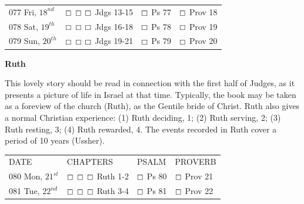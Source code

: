 \documentclass[11pt,landscape,twocolumn,letterpaper]{article}
\begin{document}
\begin{tabular}{p{0.85in}p{1.25in}p{1.2in}p{1.2in}}
\tiny 077 \normalsize Fri, $18^{nd}$ & $\boxempty$ $\boxempty$ $\boxempty$ \hspace{.05in} \textcolor[rgb]{1.00,0.00,0.00}{Jdgs 13-15} & $\boxempty$ \hspace{.05in} \textcolor[rgb]{0.00,1.00,0.00}{Ps 77} & $\boxempty$ \hspace{.05in} \textcolor[rgb]{0.00,0.00,1.00}{Prov 18}  \\

\tiny 078 \normalsize Sat, $19^{th}$ & $\boxempty$ $\boxempty$ $\boxempty$ \hspace{.05in} \textcolor[rgb]{1.00,0.00,0.00}{Jdgs 16-18} & $\boxempty$ \hspace{.05in} \textcolor[rgb]{0.00,1.00,0.00}{Ps 78} & $\boxempty$ \hspace{.05in} \textcolor[rgb]{0.00,0.00,1.00}{Prov 19}  \\

\tiny 079 \normalsize Sun, $20^{th}$ & $\boxempty$ $\boxempty$ $\boxempty$ \hspace{.05in} \textcolor[rgb]{1.00,0.00,0.00}{Jdgs 19-21} & $\boxempty$ \hspace{.05in} \textcolor[rgb]{0.00,1.00,0.00}{Ps 79} & $\boxempty$ \hspace{.05in} \textcolor[rgb]{0.00,0.00,1.00}{Prov 20}  \\

\end{tabular}  
\newpage

\begin{center}
\textbf{Ruth}
\end{center}
This lovely story should be read in connection with the first half of Judges, as it presents a picture of life in Israel at that time. Typically, the book may be taken as a foreview of the church (Ruth), as the Gentile bride of Christ. Ruth also gives a normal Christian experience: (1) Ruth deciding, 1; (2) Ruth serving, 2; (3) Ruth resting, 3; (4) Ruth rewarded, 4. The events recorded in Ruth cover a period of 10 years (Ussher).
\begin{tabular}{p{0.85in}p{1.25in}p{1.2in}p{1.2in}}
DATE & CHAPTERS & PSALM & PROVERB \\
\tiny 080 \normalsize Mon, $21^{st}$ & $\boxempty$ $\boxempty$ $\boxempty$ \hspace{.05in} \textcolor[rgb]{1.00,0.00,0.00}{Ruth 1-2} & $\boxempty$ \hspace{.05in} \textcolor[rgb]{0.00,1.00,0.00}{Ps 80} & $\boxempty$ \hspace{.05in} \textcolor[rgb]{0.00,0.00,1.00}{Prov 21}  \\

\tiny 081 \normalsize Tue, $22^{nd}$ & $\boxempty$ $\boxempty$ $\boxempty$ \hspace{.05in} \textcolor[rgb]{1.00,0.00,0.00}{Ruth 3-4} & $\boxempty$ \hspace{.05in} \textcolor[rgb]{0.00,1.00,0.00}{Ps 81} & $\boxempty$ \hspace{.05in} \textcolor[rgb]{0.00,0.00,1.00}{Prov 22}  \\
\end{tabular} 
\end{document}
